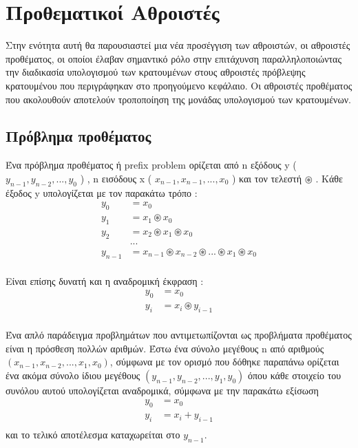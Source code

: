 \section{Προθεματικοί Αθροιστές}
Στην ενότητα αυτή θα παρουσιαστεί μια νέα προσέγγιση των αθροιστών, οι αθροιστές προθέματος, οι οποίοι έλαβαν σημαντικό ρόλο στην επιτάχυνση παραλληλοποιώντας την διαδικασία υπολογισμού των κρατουμένων στους αθροιστές πρόβλεψης κρατουμένου που περιγράφηκαν στο προηγούμενο κεφάλαιο. Οι αθροιστές προθέματος που ακολουθούν αποτελούν τροποποίηση της μονάδας υπολογισμού των κρατουμένων.





\subsection{Πρόβλημα προθέματος}

Ένα πρόβλημα προθέματος ή prefix problem
ορίζεται από n εξόδους y ( $y_{n-1},y_{n-2}, ... ,y_0 $ ) , n εισόδους x ( $x_{n-1},x_{n-1}, ... ,x_0 $ ) και τον τελεστή $\circledast$ .
Κάθε έξοδος y υπολογίζεται με τον παρακάτω τρόπο :
\begin{equation}
\begin{split}
y_0 &= x_0\\
y_1 &= x_1 \circledast x_0\\
y_2 &= x_2 \circledast x_1 \circledast x_0\\
&...\\
y_{n-1} &= x_{n-1} \circledast x_{n-2} \circledast ... \circledast x_{1} \circledast x_0\\
\end{split}
\end{equation}

Είναι επίσης δυνατή και η αναδρομική έκφραση :
\begin{equation}
\begin{split}
y_0 &= x_0\\
y_{i} &= x_{i} \circledast y_{i-1}\\
\end{split}
\end{equation}

Ένα απλό παράδειγμα προβλημάτων που αντιμετωπίζονται ως προβλήματα προθέματος είναι 
η πρόσθεση πολλών αριθμών. Έστω ένα σύνολο μεγέθους n από αριθμούς 
$(x_{n-1},x_{n-2}, ... ,x_1,x_0)$, σύμφωνα με τον ορισμό που δόθηκε παραπάνω
ορίζεται ένα ακόμα σύνολο ίδιου μεγέθους $(y_{n-1},y_{n-2}, ... ,y_1,y_0)$ 
όπου κάθε στοιχείο του συνόλου αυτού υπολογίζεται αναδρομικά, σύμφωνα με την παρακάτω εξίσωση
\begin{equation*}
\begin{split}
y_0 &= x_0\\
y_{i} &= x_{i} + y_{i-1}\\
\end{split}
\end{equation*}
και το τελικό αποτέλεσμα καταχωρείται στο $y_{n-1}$.

